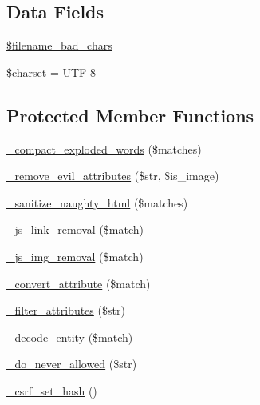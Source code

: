\subsection*{Data Fields}
\begin{DoxyCompactItemize}
\item 
\hyperlink{class_c_i___security_a7ea55abf18a7d5ed32df02a8144b72e2}{\$filename\+\_\+bad\+\_\+chars}
\item 
\hyperlink{class_c_i___security_af10158dd74b75f1d337e83102d6b82ce}{\$charset} = \textquotesingle{}U\+T\+F-\/8\textquotesingle{}
\end{DoxyCompactItemize}
\subsection*{Protected Member Functions}
\begin{DoxyCompactItemize}
\item 
\hyperlink{class_c_i___security_adfb0e251ae35ae40303a302d253c3ab2}{\+\_\+compact\+\_\+exploded\+\_\+words} (\$matches)
\item 
\hyperlink{class_c_i___security_a37c160ddffea957e9eb03dbfd3471a78}{\+\_\+remove\+\_\+evil\+\_\+attributes} (\$str, \$is\+\_\+image)
\item 
\hyperlink{class_c_i___security_af67689597607833df370031fb799c92b}{\+\_\+sanitize\+\_\+naughty\+\_\+html} (\$matches)
\item 
\hyperlink{class_c_i___security_a6b1744acaf85e05c65ab17242dea4f06}{\+\_\+js\+\_\+link\+\_\+removal} (\$match)
\item 
\hyperlink{class_c_i___security_a5c5e91dc8e3df0174e4e074dd375a8db}{\+\_\+js\+\_\+img\+\_\+removal} (\$match)
\item 
\hyperlink{class_c_i___security_ae16451bcdc769285c499cbf8068b3523}{\+\_\+convert\+\_\+attribute} (\$match)
\item 
\hyperlink{class_c_i___security_aa385a9c7527f5eece656b9cac73979d3}{\+\_\+filter\+\_\+attributes} (\$str)
\item 
\hyperlink{class_c_i___security_a5289832cb3ae9cee3c12e82ede958874}{\+\_\+decode\+\_\+entity} (\$match)
\item 
\hyperlink{class_c_i___security_a61217e43f888cdf8afb1fba16b5cd9f6}{\+\_\+do\+\_\+never\+\_\+allowed} (\$str)
\item 
\hyperlink{class_c_i___security_a7064dd5501c1dfab05ba6ac8838beb01}{\+\_\+csrf\+\_\+set\+\_\+hash} ()
\end{DoxyCompactItemize}

